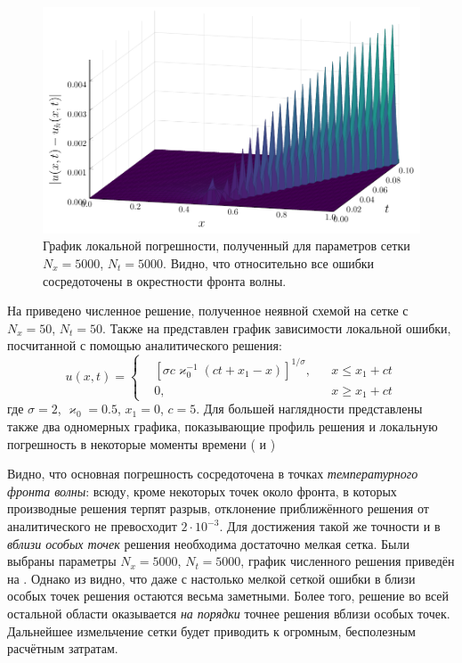 \begin{figure}
    \centering
    \includegraphics{Разностные_схемы_на_статических_сетках/Программный_код_примеры_расчётов/explicit_scheme/problem_2_implicit_error_surface_high.pdf}
    \caption{График локальной погрешности, полученный для параметров сетки $N_x = 5000$, $N_t = 5000$. Видно, что относительно все ошибки сосредоточены в окрестности фронта волны.}
    \label{fig:problem_2_implicit_error_surface_high}
\end{figure}
На  приведено численное решение, полученное неявной схемой на сетке с $N_x = 50$, $N_t = 50$.
Также на  представлен график зависимости локальной ошибки, посчитанной с помощью аналитического решения:
\begin{equation}\label{eq:problem_2}
    u(x, t) = \left\{
        \begin{aligned}
            &\left[ \sigma c\varkappa_0^{-1} (ct + x_1 - x) \right]^{1/\sigma}, && x \le x_1 + ct\\
            &0, && x \ge x_1 + ct
        \end{aligned}
    \right.
\end{equation}
где $\sigma = 2$, $\varkappa_0 = 0.5$, $x_1 = 0$, $c = 5$. 
Для большей наглядности представлены также два одномерных графика, показывающие профиль решения и локальную погрешность в некоторые моменты времени ( и )

Видно, что основная погрешность сосредоточена в точках \emph{температурного фронта волны}: всюду, кроме некоторых точек около фронта, в которых производные решения терпят разрыв, отклонение приближённого решения от аналитического не превосходит $2\cdot 10^{-3}$.
Для достижения такой же точности и в \emph{вблизи особых точек} решения необходима достаточно мелкая сетка.
Были выбраны параметры $N_x = 5000$, $N_t = 5000$, график численного решения приведён на .
Однако из  видно, что даже с настолько мелкой сеткой ошибки в близи особых точек решения остаются весьма заметными.
Более того, решение во всей остальной области оказывается \emph{на порядки} точнее решения вблизи особых точек.
Дальнейшее измельчение сетки будет приводить к огромным, бесполезным расчётным затратам.

